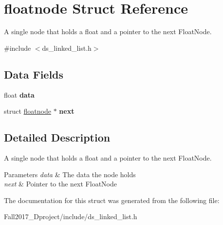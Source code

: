 \hypertarget{structfloatnode}{}\section{floatnode Struct Reference}
\label{structfloatnode}


A single node that holds a float and a pointer to the next Float\+Node.  




{\ttfamily \#include $<$ds\+\_\+linked\+\_\+list.\+h$>$}

\subsection*{Data Fields}
\begin{DoxyCompactItemize}
\item 
\mbox{\label{structfloatnode_a173b91873a3fc4f50a95416a6204d963}} 
float {\bfseries data}
\item 
\mbox{\label{structfloatnode_af90dc45dc8f8a54155781bbcea52c85d}} 
struct \hyperlink{structfloatnode}{floatnode} $\ast$ {\bfseries next}
\end{DoxyCompactItemize}


\subsection{Detailed Description}
A single node that holds a float and a pointer to the next Float\+Node. 


\begin{DoxyParams}{Parameters}
{\em data} & The data the node holds \\
\hline
{\em next} & Pointer to the next Float\+Node \\
\hline
\end{DoxyParams}


The documentation for this struct was generated from the following file\+:\begin{DoxyCompactItemize}
\item 
Fall2017\+\_\+Dproject/include/ds\+\_\+linked\+\_\+list.\+h\end{DoxyCompactItemize}
